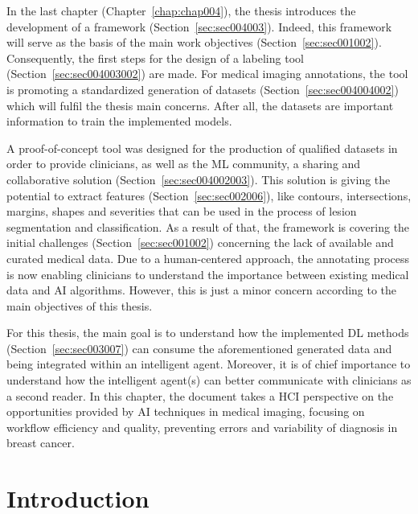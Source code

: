 \clearpage
\label{chap:chap005}

In the last chapter (Chapter~\ref{chap:chap004}), the thesis introduces the development of a framework (Section~\ref{sec:sec004003}).
Indeed, this framework will serve as the basis of the main work objectives (Section~\ref{sec:sec001002}).
Consequently, the first steps for the design of a labeling tool (Section~\ref{sec:sec004003002}) are made.
For medical imaging annotations, the tool is promoting a standardized generation of datasets (Section~\ref{sec:sec004004002}) which will fulfil the thesis main concerns.
After all, the datasets are important information to train the implemented models.

A proof-of-concept tool was designed for the production of qualified datasets in order to provide clinicians, as well as the \ac{ML} community, a sharing and collaborative solution (Section~\ref{sec:sec004002003}).
This solution is giving the potential to extract features (Section~\ref{sec:sec002006}), like contours, intersections, margins, shapes and severities that can be used in the process of lesion segmentation and classification.
As a result of that, the framework is covering the initial challenges (Section~\ref{sec:sec001002}) concerning the lack of available and curated medical data.
Due to a human-centered approach, the annotating process is now enabling clinicians to understand the importance between existing medical data and \ac{AI} algorithms.
However, this is just a minor concern according to the main objectives of this thesis.

For this thesis, the main goal is to understand how the implemented \ac{DL} methods (Section~\ref{sec:sec003007}) can consume the aforementioned generated data and being integrated within an intelligent agent.
Moreover, it is of chief importance to understand how the intelligent agent(s) can better communicate with clinicians as a second reader.
In this chapter, the document takes a \ac{HCI} perspective on the opportunities provided by \ac{AI} techniques in medical imaging, focusing on workflow efficiency and quality, preventing errors and variability of diagnosis in breast cancer.

\section{Introduction}
\label{sec:sec005001}

